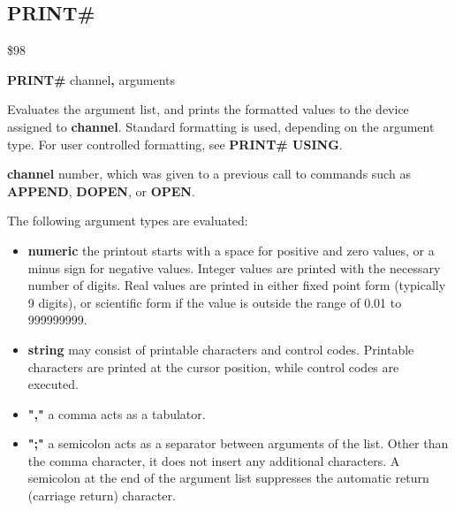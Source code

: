 
\newpage
\subsection{PRINT\#}
\begin{description}[leftmargin=2cm,style=nextline]
\item [Token:] \$98
\item [Format:] {\bf PRINT\#} channel{\bf,} arguments
\item [Usage:]  Evaluates the argument list, and prints the formatted
                values to the device assigned to {\bf channel}.
                Standard formatting is used, depending on the
                argument type. For user controlled formatting,
                see {\bf PRINT\# USING}.

                {\bf channel} number, which was given to a previous
                call to commands such as {\bf APPEND}, {\bf DOPEN}, or {\bf OPEN}.

                The following argument types are evaluated:
                \begin{itemize}
                    \item {\bf numeric} the printout starts with a space
                    for positive and zero values, or a minus sign for
                    negative values. Integer values are printed with
                    the necessary number of digits. Real values are
                    printed in either fixed point form (typically
                    9 digits), or scientific form if the value is
                    outside the range of 0.01 to 999999999.

                    \item {\bf string} may consist of printable
                    characters and control codes. Printable characters
                    are printed at the cursor position, while control
                    codes are executed.

                    \item {\bf ","} a comma acts as a tabulator.

                    \item {\bf ";"} a semicolon acts as a separator between
                    arguments of the list. Other than the comma character,
                    it does not insert any additional characters.
                    A semicolon at the end of the argument list suppresses
                    the automatic return (carriage return) character.
                \end{itemize}


\end{description}
